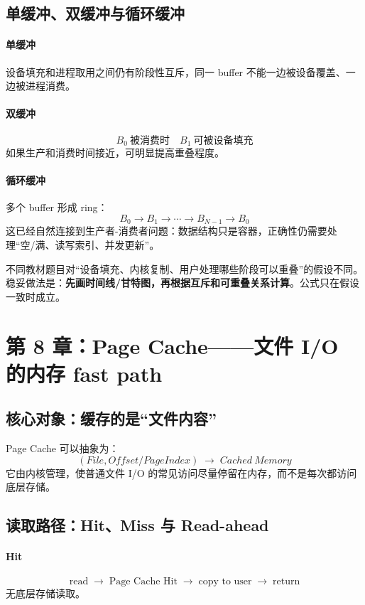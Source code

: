 \documentclass[11pt,a4paper]{ctexart}
\newcommand{\kw}[1]{\textbf{#1}}
\newcommand{\arr}{\;\longrightarrow\;}
\begin{document}
\subsection{单缓冲、双缓冲与循环缓冲}
\paragraph{单缓冲}
设备填充和进程取用之间仍有阶段性互斥，同一 buffer 不能一边被设备覆盖、一边被进程消费。

\paragraph{双缓冲}
\[
B_0\ \text{被消费时}\quad B_1\ \text{可被设备填充}
\]
如果生产和消费时间接近，可明显提高重叠程度。

\paragraph{循环缓冲}
多个 buffer 形成 ring：
\[
B_0\to B_1\to\cdots\to B_{N-1}\to B_0
\]
这已经自然连接到生产者-消费者问题：数据结构只是容器，正确性仍需要处理“空/满、读写索引、并发更新”。

\begin{exam}[缓冲题不要死背总时间公式]
不同教材题目对“设备填充、内核复制、用户处理哪些阶段可以重叠”的假设不同。稳妥做法是：\kw{先画时间线/甘特图，再根据互斥和可重叠关系计算}。公式只在假设一致时成立。
\end{exam}

\section{第 8 章：Page Cache——文件 I/O 的内存 fast path}

\subsection{核心对象：缓存的是“文件内容”}
Page Cache 可以抽象为：
\[
\boxed{(File,Offset/PageIndex)\arr Cached\ Memory}
\]
它由内核管理，使普通文件 I/O 的常见访问尽量停留在内存，而不是每次都访问底层存储。

\subsection{读取路径：Hit、Miss 与 Read-ahead}
\paragraph{Hit}
\[
\text{read}\arr\text{Page Cache Hit}\arr\text{copy to user}\arr\text{return}
\]
无底层存储读取。
\end{document}
